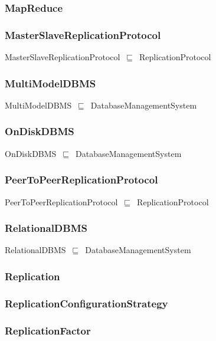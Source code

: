 \documentclass{article}
\begin{document}
\subsubsection*{MapReduce}

\subsubsection*{MasterSlaveReplicationProtocol}

MasterSlaveReplicationProtocol~\ensuremath{\sqsubseteq}~ReplicationProtocol~

\subsubsection*{MultiModelDBMS}

MultiModelDBMS~\ensuremath{\sqsubseteq}~DatabaseManagementSystem~

\subsubsection*{OnDiskDBMS}

OnDiskDBMS~\ensuremath{\sqsubseteq}~DatabaseManagementSystem~

\subsubsection*{PeerToPeerReplicationProtocol}

PeerToPeerReplicationProtocol~\ensuremath{\sqsubseteq}~ReplicationProtocol~

\subsubsection*{RelationalDBMS}

RelationalDBMS~\ensuremath{\sqsubseteq}~DatabaseManagementSystem~

\subsubsection*{Replication}

\subsubsection*{ReplicationConfigurationStrategy}

\subsubsection*{ReplicationFactor}
\end{document}
